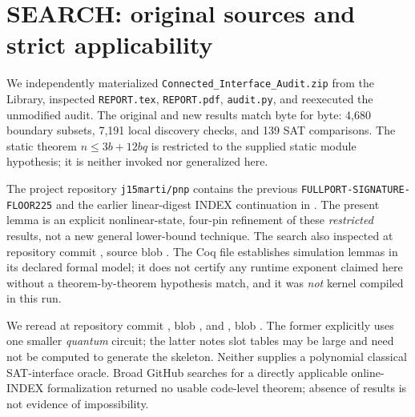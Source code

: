 \documentclass[11pt]{article}
\begin{document}
\section{SEARCH: original sources and strict applicability}
We independently materialized \texttt{Connected\_Interface\_Audit.zip} from the Library, inspected \texttt{REPORT.tex}, \texttt{REPORT.pdf}, \texttt{audit.py}, and reexecuted the unmodified audit. The original and new results match byte for byte: 4,680 boundary subsets, 7,191 local discovery checks, and 139 SAT comparisons. The static theorem $n\le 3b+12bq$ is restricted to the supplied static module hypothesis; it is neither invoked nor generalized here.

The project repository \texttt{j15marti/pnp} contains the previous \texttt{FULLPORT-SIGNATURE-FLOOR225} and the earlier linear-digest INDEX continuation in . The present lemma is an explicit nonlinear-state, four-pin refinement of these \emph{restricted} results, not a new general lower-bound technique. The search also inspected  at repository commit \texttt{}, source blob \texttt{}. The Coq file establishes simulation lemmas in its declared formal model; it does not certify any runtime exponent claimed here without a theorem-by-theorem hypothesis match, and it was \emph{not} kernel compiled in this run.

We reread  at repository commit \texttt{}, blob \texttt{}, and , blob \texttt{}. The former explicitly uses one smaller \emph{quantum} circuit; the latter notes slot tables may be large and need not be computed to generate the skeleton. Neither supplies a polynomial classical SAT-interface oracle. Broad GitHub searches for a directly applicable online-INDEX formalization returned no usable code-level theorem; absence of results is not evidence of impossibility.
\end{document}
